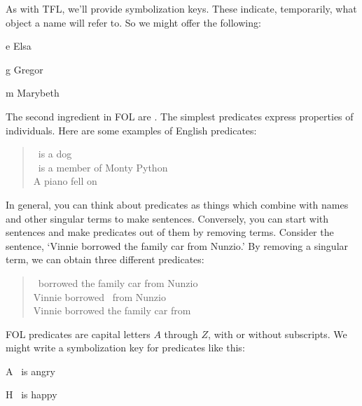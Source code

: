 As with TFL, we'll provide symbolization keys. These indicate, temporarily, what object a name will refer to. So we might offer the following:
	\begin{ekey}
		\item[e] Elsa
		\item[g] Gregor
		\item[m] Marybeth
	\end{ekey}

The second ingredient in FOL are .   The simplest predicates express properties of individuals. Here are some examples of English predicates:
	\begin{quote}
		\blank\ is a dog\\
		\blank\ is a member of Monty Python\\
		A piano fell on \blank
	\end{quote}
In general, you can think about predicates as things which combine with names and other singular terms to make sentences. Conversely, you can start with sentences and make predicates out of them by removing terms. Consider the sentence, `Vinnie borrowed the family car from Nunzio.' By removing a singular term, we can obtain three different predicates:
	\begin{quote}
		\blank\ borrowed the family car from Nunzio\\
		Vinnie borrowed \blank\ from Nunzio\\
		Vinnie borrowed the family car from \blank
	\end{quote}
FOL predicates are capital letters $A$ through $Z$, with or without subscripts. We might write a symbolization key for predicates  like this:
	\begin{ekey}
		\item[A] \blank\ is angry
		\item[H] \blank\ is happy
	\end{ekey}

